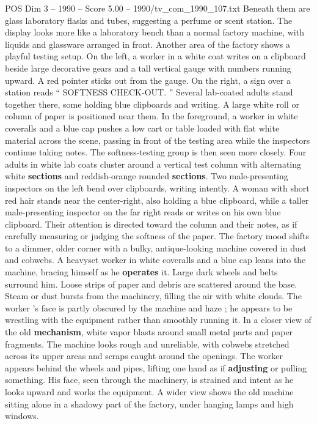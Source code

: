 \begin{textsample}{POS Dim 3 – 1990 – Score 5.00 – 1990/tv\_com\_1990\_107.txt}
Beneath them are glass laboratory flasks and tubes, suggesting a perfume or scent station.
The display looks more like a laboratory bench than a normal factory machine, with liquids and glassware arranged in front.
Another area of the factory shows a playful testing setup.
On the left, a worker in a white coat writes on a clipboard beside large decorative gears and a tall vertical gauge with numbers running upward.
A red pointer sticks out from the gauge.
On the right, a sign over a station reads “ SOFTNESS CHECK-OUT. ” Several lab-coated adults stand together there, some holding blue clipboards and writing.
A large white roll or column of paper is positioned near them.
In the foreground, a worker in white coveralls and a blue cap pushes a low cart or table loaded with flat white material across the scene, passing in front of the testing area while the inspectors continue taking notes.
The softness-testing group is then seen more closely.
Four adults in white lab coats cluster around a vertical test column with alternating white \textbf{sections} and reddish-orange rounded \textbf{sections}.
Two male-presenting inspectors on the left bend over clipboards, writing intently.
A woman with short red hair stands near the center-right, also holding a blue clipboard, while a taller male-presenting inspector on the far right reads or writes on his own blue clipboard.
Their attention is directed toward the column and their notes, as if carefully measuring or judging the softness of the paper.
The factory mood shifts to a dimmer, older corner with a bulky, antique-looking machine covered in dust and cobwebs.
A heavyset worker in white coveralls and a blue cap leans into the machine, bracing himself as he \textbf{operates} it.
Large dark wheels and belts surround him.
Loose strips of paper and debris are scattered around the base.
Steam or dust bursts from the machinery, filling the air with white clouds.
The worker ’s face is partly obscured by the machine and haze ; he appears to be wrestling with the equipment rather than smoothly running it.
In a closer view of the old \textbf{mechanism}, white vapor blasts around small metal parts and paper fragments.
The machine looks rough and unreliable, with cobwebs stretched across its upper areas and scraps caught around the openings.
The worker appears behind the wheels and pipes, lifting one hand as if \textbf{adjusting} or pulling something.
His face, seen through the machinery, is strained and intent as he looks upward and works the equipment.
A wider view shows the old machine sitting alone in a shadowy part of the factory, under hanging lamps and high windows.

\end{textsample}
